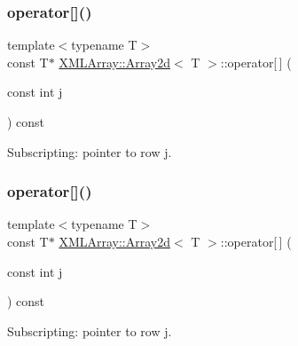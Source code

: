 \subsubsection{\texorpdfstring{operator[]()}{operator[]()}\hspace{0.1cm}{\footnotesize\ttfamily [3/4]}}
{\footnotesize\ttfamily template$<$typename T$>$ \\
const T$\ast$ \mbox{\hyperlink{classXMLArray_1_1Array2d}{X\+M\+L\+Array\+::\+Array2d}}$<$ T $>$\+::operator\mbox{[}$\,$\mbox{]} (\begin{DoxyParamCaption}\item[{const int}]{j }\end{DoxyParamCaption}) const\hspace{0.3cm}{\ttfamily [inline]}}



Subscripting\+: pointer to row j. 

\mbox{\label{classXMLArray_1_1Array2d_a956a4739a0e6529302542b0fdf3c1da8}} 
\subsubsection{\texorpdfstring{operator[]()}{operator[]()}\hspace{0.1cm}{\footnotesize\ttfamily [4/4]}}
{\footnotesize\ttfamily template$<$typename T$>$ \\
const T$\ast$ \mbox{\hyperlink{classXMLArray_1_1Array2d}{X\+M\+L\+Array\+::\+Array2d}}$<$ T $>$\+::operator\mbox{[}$\,$\mbox{]} (\begin{DoxyParamCaption}\item[{const int}]{j }\end{DoxyParamCaption}) const\hspace{0.3cm}{\ttfamily [inline]}}



Subscripting\+: pointer to row j. 

\mbox{\label{classXMLArray_1_1Array2d_a64001cb2aac062d2179a0285b0279244}} 

